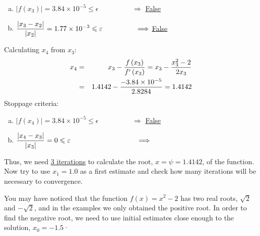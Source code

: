 \begin{list}{\bf Example :~}{}
\begin{description}
\begin{list}{{\bf Iteration } (k=):~}{}
\begin{enumerate}[(a)]
                         \item $\left|f\left(x_{3}\right)\right| = 3.84\times 10^{-5} \leq \epsilon \hspace{2cm} \Longrightarrow$ \underline{False}
                         \item $\displaystyle\frac{\left|x_{3}-x_{2}\right|}{\left|x_{2}\right|} = 1.77\times 10^{-3} \leqslant \varepsilon \hspace{1.65cm} \Longrightarrow$ \underline{False}
                    \end{enumerate}
            \item Calculating $x_{4}$ from $x_{3}$:
                  \begin{eqnarray}
                      x_{4} &=& x_{3} - \displaystyle\frac{f\left(x_{3}\right)}{f'\left(x_{3}\right)} = x_{3} - \displaystyle\frac{ x_{3}^{2}-2 }{ 2x_{3}} \nonumber \\
                           &=& 1.4142 - \displaystyle\frac{-3.84\times 10^{-5}}{2.8284} = 1.4142
                  \end{eqnarray}
                  Stoppage criteria:
                    \begin{enumerate}[(a)]
                         \item $\left|f\left(x_{4}\right)\right| = 3.84\times 10^{-5} \leq \epsilon \hspace{2cm} \Longrightarrow$ \underline{False}
                         \item $\frc{\left|x_{4}-x_{3}\right|}{\left|x_{3}\right|} = 0 \leq \epsilon \hspace{3.3cm} \Longrightarrow$ 
                    \end{enumerate}
         \end{list}
         Thus, we need \underline{3 iterations} to calculate the root, \underline{$x=\psi=1.4142$}, of the function. Now try to use $x_{1}=1.0$ as a first estimate and check how many iterations will be necessary to convergence.
       \end{description}
    You may have noticed that the function $f(x)=x^{2}-2$ has two real roots, $\sqrt{2}$ and $-\sqrt{2}$, and in the examples we only obtained the positive root. In order to find the negative root, we need to use initial estimates close enough to the solution, \eg $x_{0}=-1.5$·

\end{list}
